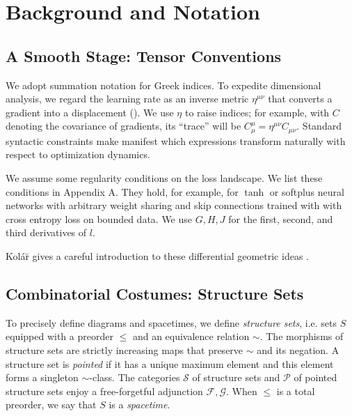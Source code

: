 \documentclass{article}
\newcommand{\Free}{\mathcal{F}}
\newcommand{\Forg}{\mathcal{G}}
\newcommand{\Ss}{\mathcal{S}}
\newcommand{\Pp}{\mathcal{P}}
\begin{document}
\section{Background and Notation}


    \subsection{A Smooth Stage: Tensor Conventions}
        We adopt summation notation for Greek indices.  To expedite dimensional
        analysis, we regard the learning rate as an inverse metric
        $\eta^{\mu\nu}$ that converts a gradient into a displacement
        (\cite{bo13}).  We use $\eta$ to raise indices; for example, with $C$
        denoting the covariance of gradients, its ``trace'' will be
        $C^{\mu}_{\mu} = \eta^{\mu\nu} C_{\mu\nu}$.  Standard syntactic
        constraints make manifest which expressions transform naturally with
        respect to optimization dynamics.

        We assume some regularity conditions on the loss landscape.  We list
        these conditions in Appendix A.  They hold, for example, for $\tanh$ or
        softplus neural networks with arbitrary weight sharing and skip
        connections trained with with cross entropy loss on bounded data.  We
        use $G, H, J$ for the first, second, and third derivatives of $l$.
        
        Kol\'{a}\u{r} gives a careful introduction to these differential
        geometric ideas .

    
    \subsection{Combinatorial Costumes: Structure Sets}
        To precisely define diagrams and spacetimes, we define \emph{structure
        sets}, i.e. sets $S$ equipped with a preorder $\leq$ and an equivalence
        relation $\sim$.  The morphisms of structure sets are strictly
        increasing maps that preserve $\sim$ and its negation.  A structure set
        is \emph{pointed} if it has a unique maximum element and this element
        forms a singleton $\sim$-class.  The categories $\Ss$ of structure sets
        and $\Pp$ of pointed structure sets enjoy a free-forgetful adjunction
        $\Free, \Forg$.  When $\leq$ is a total preorder, we say that $S$ is
        a \emph{spacetime}.
    
\end{document}
